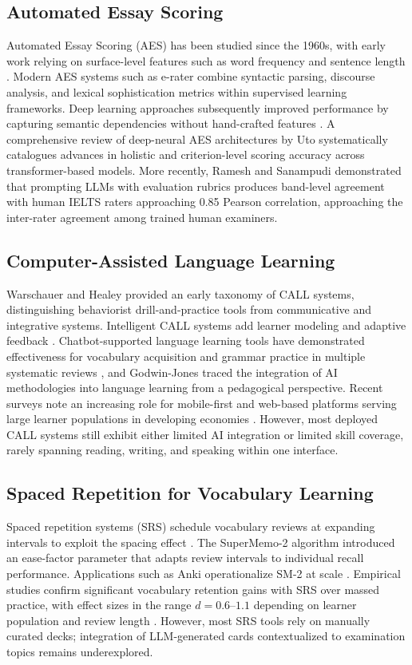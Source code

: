 \documentclass[conference]{IEEEtran}
\begin{document}
\subsection{Automated Essay Scoring}
Automated Essay Scoring (AES) has been studied since the 1960s, with early work relying on surface-level features such as word frequency and sentence length \cite{b12}. Modern AES systems such as e-rater \cite{b12} combine syntactic parsing, discourse analysis, and lexical sophistication metrics within supervised learning frameworks. Deep learning approaches subsequently improved performance by capturing semantic dependencies without hand-crafted features \cite{b8}. A comprehensive review of deep-neural AES architectures by Uto \cite{b12} systematically catalogues advances in holistic and criterion-level scoring accuracy across transformer-based models. More recently, Ramesh and Sanampudi \cite{b8} demonstrated that prompting LLMs with evaluation rubrics produces band-level agreement with human IELTS raters approaching 0.85 Pearson correlation, approaching the inter-rater agreement among trained human examiners.

\subsection{Computer-Assisted Language Learning}
Warschauer and Healey \cite{b3} provided an early taxonomy of CALL systems, distinguishing behaviorist drill-and-practice tools from communicative and integrative systems. Intelligent CALL systems add learner modeling and adaptive feedback \cite{b3}. Chatbot-supported language learning tools have demonstrated effectiveness for vocabulary acquisition and grammar practice in multiple systematic reviews \cite{b1, b2}, and Godwin-Jones \cite{b3} traced the integration of AI methodologies into language learning from a pedagogical perspective. Recent surveys note an increasing role for mobile-first and web-based platforms serving large learner populations in developing economies \cite{b4}. However, most deployed CALL systems still exhibit either limited AI integration or limited skill coverage, rarely spanning reading, writing, and speaking within one interface.

\subsection{Spaced Repetition for Vocabulary Learning}
Spaced repetition systems (SRS) schedule vocabulary reviews at expanding intervals to exploit the spacing effect \cite{b4}. The SuperMemo-2 algorithm \cite{b8} introduced an ease-factor parameter that adapts review intervals to individual recall performance. Applications such as Anki operationalize SM-2 at scale \cite{b1}. Empirical studies confirm significant vocabulary retention gains with SRS over massed practice, with effect sizes in the range $d = 0.6$--$1.1$ depending on learner population and review length \cite{b4}. However, most SRS tools rely on manually curated decks; integration of LLM-generated cards contextualized to examination topics remains underexplored.
\end{document}
